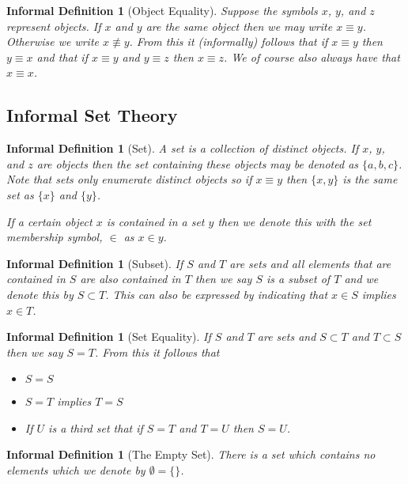 \documentclass[12pt]{article}
\theoremstyle{break}
\theoremstyle{break}
\theoremstyle{break}
\theoremstyle{break}
\theoremstyle{break}
\newtheorem{informal definition}[definition]{Informal Definition}
\theoremstyle{break}
\newtheorem{informal theorem}[theorem]{Informal Theorem}
\begin{document}
\begin{informal definition}[Object Equality]
Suppose the symbols $x$, $y$, and $z$ represent objects.
If $x$ and $y$ are the same object then we may write $x \equiv y$. Otherwise we write $x\not \equiv y$.
From this it (informally) follows that if $x\equiv y$ then $y \equiv x$ and that if $x \equiv y$ and $y \equiv z$ then $x \equiv z$.
We of course also always have that $x \equiv x$.
\end{informal definition}


\subsection{Informal Set Theory}

\begin{informal definition}[Set]
A set is a collection of distinct objects.
If $x$, $y$, and $z$ are objects then the set containing these objects may be denoted as $\{a, b, c\}$.
Note that sets only enumerate distinct objects so if $x\equiv y$ then $\{x, y\}$ is the same set as $\{x\}$ and $\{y\}$.

If a certain object $x$ is contained in a set $y$ then we denote this with the set membership symbol, $\in$ as $x \in y$.
\end{informal definition}

\begin{informal definition}[Subset]
If $S$ and $T$ are sets and all elements that are contained in $S$ are also contained in $T$ then we say $S$ is a subset of $T$ and we denote this by $S \subset T$.
This can also be expressed by indicating that $x\in S$ implies $x \in T$.
\end{informal definition}

\begin{informal definition}[Set Equality]
If $S$ and $T$ are sets and $S\subset T$ and $T\subset S$ then we say $S=T$.
From this it follows that
\begin{itemize}
\item{$S=S$}
\item{$S=T$ implies $T=S$}
\item{If $U$ is a third set that if $S=T$ and $T=U$ then $S=U$.}
\end{itemize}
\end{informal definition}

\begin{informal definition}[The Empty Set]
There is a set which contains no elements which we denote by $\emptyset = \{\}$.
\end{informal definition}
\end{document}
